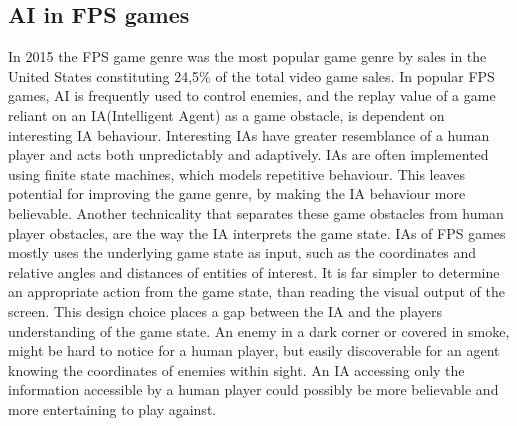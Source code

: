 \subsection{AI in FPS games}
In 2015 the FPS game genre was the most popular game genre by sales in the United States\cite{marketshare} constituting 24,5\% of the total video game sales. In popular FPS games, AI is frequently used to control enemies, and the replay value of a game reliant on an IA(Intelligent Agent) as a game obstacle, is dependent on interesting IA behaviour. Interesting IAs have greater resemblance of a human player and acts both unpredictably and adaptively. IAs are often implemented using finite state machines, which models repetitive behaviour. This leaves potential for improving the game genre, by making the IA behaviour more believable. Another technicality that separates these game obstacles from human player obstacles, are the way the IA interprets the game state. IAs of FPS games mostly uses the underlying game state as input, such as the coordinates and relative angles and distances of entities of interest. It is far simpler to determine an appropriate action from the game state, than reading the visual output of the screen. This design choice places a gap between the IA and the players understanding of the game state. An enemy in a dark corner or covered in smoke, might be hard to notice for a human player, but easily discoverable for an agent knowing the coordinates of enemies within sight. An IA accessing only the information accessible by a human player could possibly be more believable and more entertaining to play against. 

